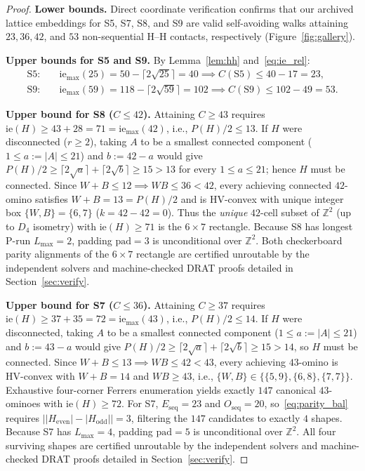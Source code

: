 \documentclass[11pt]{article}
\newcommand{\Z}{\mathbb{Z}}
\begin{document}
\begin{proof}
\textbf{Lower bounds.} Direct coordinate verification confirms that our archived lattice embeddings for S5, S7, S8, and S9 are valid self-avoiding walks attaining $23, 36, 42$, and $53$ non-sequential H--H contacts, respectively (Figure~\ref{fig:gallery}).

\textbf{Upper bounds for S5 and S9.} By Lemma~\ref{lem:hh} and~\eqref{eq:ie_rel}:
\begin{align*}
  \mathrm{S5}:&\quad \mathrm{ie}_{\max}(25) = 50 - \lceil 2\sqrt{25}\rceil = 40 \implies C(\mathrm{S5}) \le 40 - 17 = 23, \\
  \mathrm{S9}:&\quad \mathrm{ie}_{\max}(59) = 118 - \lceil 2\sqrt{59}\rceil = 102 \implies C(\mathrm{S9}) \le 102 - 49 = 53.
\end{align*}

\textbf{Upper bound for S8 ($C \le 42$).} Attaining $C \ge 43$ requires $\mathrm{ie}(H) \ge 43 + 28 = 71 = \mathrm{ie}_{\max}(42)$, i.e., $P(H)/2 \le 13$. If $H$ were disconnected ($r \ge 2$), taking $A$ to be a smallest connected component ($1 \le a := |A| \le 21$) and $b := 42 - a$ would give $P(H)/2 \ge \lceil 2\sqrt{a}\rceil + \lceil 2\sqrt{b}\rceil \ge 15 > 13$ for every $1 \le a \le 21$; hence $H$ must be connected. Since $W + B \le 12 \implies W B \le 36 < 42$, every achieving connected $42$-omino satisfies $W + B = 13 = P(H)/2$ and is HV-convex with unique integer box $\{W, B\} = \{6, 7\}$ ($k = 42 - 42 = 0$). Thus the \emph{unique} $42$-cell subset of $\Z^2$ (up to $D_4$ isometry) with $\mathrm{ie}(H) \ge 71$ is the $6 \times 7$ rectangle. Because S8 has longest P-run $L_{\max} = 2$, padding $\mathrm{pad} = 3$ is unconditional over $\Z^2$. Both checkerboard parity alignments of the $6 \times 7$ rectangle are certified unroutable by the independent solvers and machine-checked DRAT proofs detailed in Section~\ref{sec:verify}.

\textbf{Upper bound for S7 ($C \le 36$).} Attaining $C \ge 37$ requires $\mathrm{ie}(H) \ge 37 + 35 = 72 = \mathrm{ie}_{\max}(43)$, i.e., $P(H)/2 \le 14$. If $H$ were disconnected, taking $A$ to be a smallest connected component ($1 \le a := |A| \le 21$) and $b := 43 - a$ would give $P(H)/2 \ge \lceil 2\sqrt{a}\rceil + \lceil 2\sqrt{b}\rceil \ge 15 > 14$, so $H$ must be connected. Since $W + B \le 13 \implies W B \le 42 < 43$, every achieving $43$-omino is HV-convex with $W + B = 14$ and $W B \ge 43$, i.e., $\{W, B\} \in \{\{5, 9\}, \{6, 8\}, \{7, 7\}\}$. Exhaustive four-corner Ferrers enumeration yields exactly $147$ canonical $43$-ominoes with $\mathrm{ie}(H) \ge 72$. For S7, $E_{\mathrm{seq}} = 23$ and $O_{\mathrm{seq}} = 20$, so~\eqref{eq:parity_bal} requires $\bigl||H_{\mathrm{even}}| - |H_{\mathrm{odd}}|\bigr| = 3$, filtering the $147$ candidates to exactly $4$ shapes. Because S7 has $L_{\max} = 4$, padding $\mathrm{pad} = 5$ is unconditional over $\Z^2$. All four surviving shapes are certified unroutable by the independent solvers and machine-checked DRAT proofs detailed in Section~\ref{sec:verify}.
\end{proof}
\end{document}
